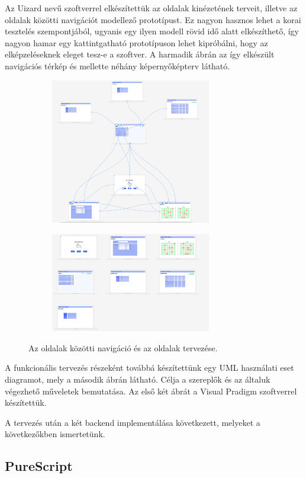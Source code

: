 \documentclass[12pt]{article}
\begin{document}
Az Uizard\cite{uizard} nevű szoftverrel elkészítettük az oldalak kinézetének terveit, illetve az oldalak közötti navigációt modellező prototípust. Ez nagyon hasznos lehet a korai tesztelés szempontjából, ugyanis egy ilyen modell rövid idő alatt elkészíthető, így nagyon hamar egy kattintgatható prototípuson lehet kipróbálni, hogy az elképzeléseknek eleget tesz-e a szoftver. A harmadik ábrán az így elkészült navigációs térkép és mellette néhány képernyőképterv látható.
\begin{figure}[h!]
\centering
\begin{subfigure}{0.45\textwidth}
\includegraphics[width=7cm]{navigation} 
\end{subfigure}
\begin{subfigure}{0.4\textwidth}
\includegraphics[width=7cm]{pages}
\end{subfigure}
\caption{Az oldalak közötti navigáció és az oldalak tervezése.}
\end{figure}

A funkcionális tervezés részeként továbbá készítettünk egy UML használati eset diagramot, mely a második ábrán látható. Célja a szereplők és az általuk végezhető műveletek bemutatása. Az első két ábrát a Visual Pradigm szoftverrel készítettük.

A tervezés után a két backend implementálása következett, melyeket a következőkben ismertetünk.

\newpage
\subsection{PureScript}
\end{document}
